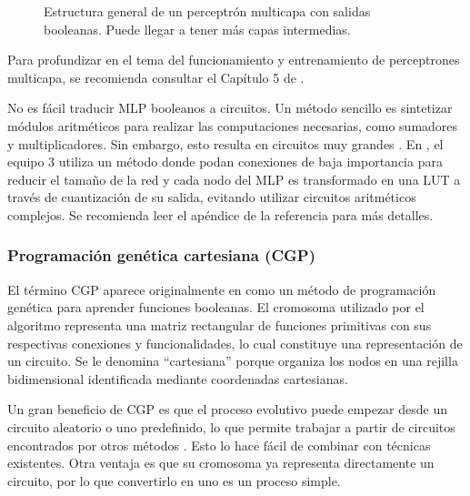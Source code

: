 \begin{figure}[htb]
  \centering
  
  \caption{Estructura general de un perceptrón multicapa con salidas booleanas.
    Puede llegar a tener más capas intermedias.}
  \label{fig:MLP}
\end{figure}

Para profundizar en el tema del funcionamiento y entrenamiento de perceptrones
multicapa, se recomienda consultar el Capítulo 5 de \cite{bishop_pattern_2006}.

No es fácil traducir MLP booleanos a circuitos. Un método sencillo es
sintetizar módulos aritméticos para realizar las computaciones necesarias, como
sumadores y multiplicadores. Sin embargo, esto resulta en circuitos muy grandes
\cite{miyasaka_logic_2021}. En \cite{rai_logic_2021}, el equipo 3 utiliza un
método donde podan conexiones de baja importancia para reducir el tamaño de la
red y cada nodo del MLP es transformado en una LUT a través de cuantización de
su salida, evitando utilizar circuitos aritméticos complejos. Se recomienda
leer el apéndice de la referencia para más detalles.

\subsubsection{Programación genética cartesiana (CGP)}

El término CGP aparece originalmente en \cite{miller_empirical_1999} como un
método de programación genética para aprender funciones booleanas. El cromosoma
utilizado por el algoritmo representa una matriz rectangular de funciones
primitivas con sus respectivas conexiones y funcionalidades, lo cual constituye
una representación de un circuito. Se le denomina ``cartesiana'' porque
organiza los nodos en una rejilla bidimensional identificada mediante
coordenadas cartesianas.

Un gran beneficio de CGP es que el proceso evolutivo puede empezar desde un
circuito aleatorio o uno predefinido, lo que permite trabajar a partir de
circuitos encontrados por otros métodos \cite{berndt_cgp-based_2022}. Esto lo
hace fácil de combinar con técnicas existentes. Otra ventaja es que su
cromosoma ya representa directamente un circuito, por lo que convertirlo en uno
es un proceso simple.
